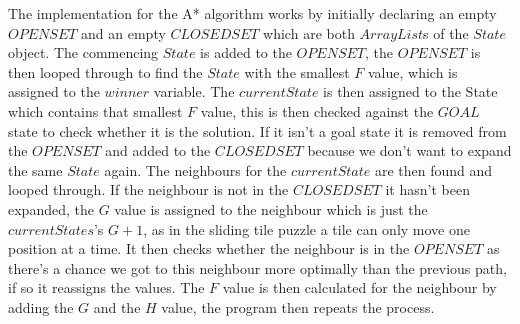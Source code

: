 \documentclass[final]{cmpreport}
\begin{document}
The implementation for the A* algorithm works by initially declaring an empty $OPENSET$ and an empty $CLOSEDSET$ which are both  $ArrayList$s of the $State$ object. The commencing $State$ is added to the $OPENSET$, the $OPENSET$ is then looped through to find the $State$ with the smallest $F$ value, which is assigned to the $winner$ variable. The $currentState$ is then assigned to the State which contains that smallest $F$ value, this is then checked against the $GOAL$ state to check whether it is the solution. If it isn't a goal state it is removed from the $OPENSET$ and added to the $CLOSEDSET$ because we don't want to expand the same $State$ again.
The neighbours for the $currentState$ are then found and looped through. If the neighbour is not in the $CLOSEDSET$ it hasn't been expanded, the $G$ value is assigned to the neighbour which is just the $currentStates$'s $G+1$, as in the sliding tile puzzle a tile can only move one position at a time. It then checks whether the neighbour is in the $OPENSET$ as there's a chance we got to this neighbour more optimally than the previous path, if so it reassigns the values. The $F$ value is then calculated for the neighbour by adding the $G$ and the $H$ value, the program then repeats the process.
\end{document}
